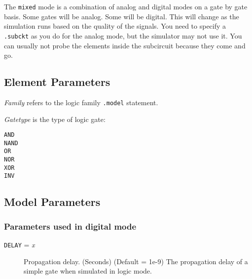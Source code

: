 The {\tt mixed} mode is a combination of analog and digital modes on a
gate by gate basis.  Some gates will be analog.  Some will be digital.
This will change as the simulation runs based on the quality of the
signals.  You need to specify a {\tt .subckt} as you do for the analog
mode, but the simulator may not use it.  You can usually not probe the
elements inside the subcircuit because they come and go.
\subsection{Element Parameters}

{\em Family} refers to the logic family {\tt .model} statement.

{\em Gatetype} is the type of logic gate:

\begin{description}

\item[{\tt AND}]

\item[{\tt NAND}]

\item[{\tt OR}]

\item[{\tt NOR}]

\item[{\tt XOR}]

\item[{\tt INV}]

\end{description}
\subsection{Model Parameters}

\subsubsection{Parameters used in digital mode}
\begin{description}

\item[{\tt DELAY} = {\it x}] Propagation delay.  (Seconds) (Default = 1e-9)
The propagation delay of a simple gate when simulated in logic mode.

\end{description}
